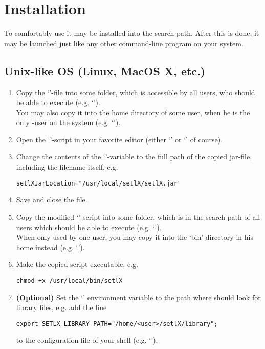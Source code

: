 \section{Installation}

To comfortably use \setlX{} it may be installed into the search-path. After this is done, it may be launched just like any other command-line program on your system.

\subsection{Unix-like OS (Linux, MacOS X, etc.)}\label{Unix}

\begin{enumerate}
	\item Copy the `'-file into some folder, which is accessible by all users, who should be able to execute \setlX{} (e.g. `').\\
	You may also copy it into the home directory of some user, when he is the only \setlX-user on the system (e.g. `').
	\item Open the `'-script in your favorite editor (either `' or `' of course).
	\item Change the contents of the `'-variable to the full path of the copied jar-file, including the filename itself, e.g.
\begin{lstlisting}[frame=none,numbers=none]
setlXJarLocation="/usr/local/setlX/setlX.jar"
\end{lstlisting}
	\item Save and close the file.
	\item Copy the modified `'-script into some folder, which is in the search-path of all users which should be able to execute \setlX{} (e.g. `').\\
	When only used by one user, you may copy it into the `bin' directory in his home instead (e.g. `').
	\item Make the copied script executable, e.g.
\begin{lstlisting}[frame=none,numbers=none]
chmod +x /usr/local/bin/setlX
\end{lstlisting}
	\item \textbf{(Optional)} Set the `' environment variable to the path where \setlX{} should look for library files, e.g. add the line
\begin{lstlisting}[frame=none,numbers=none]
export SETLX_LIBRARY_PATH="/home/<user>/setlX/library";
\end{lstlisting}
to the configuration file of your shell (e.g. `').
\end{enumerate}

